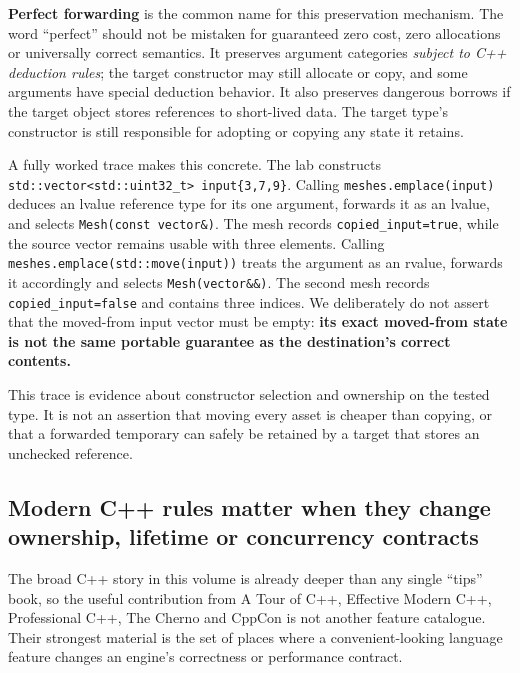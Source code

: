 \textbf{Perfect forwarding} is the common name for this preservation mechanism. The word ``perfect'' should not be mistaken for guaranteed zero cost, zero allocations or universally correct semantics. It preserves argument categories \emph{subject to C++ deduction rules}; the target constructor may still allocate or copy, and some arguments have special deduction behavior. It also preserves dangerous borrows if the target object stores references to short-lived data. The target type's constructor is still responsible for adopting or copying any state it retains.

A fully worked trace makes this concrete. The lab constructs \texttt{std::vector\textless{}std::uint32\_t\textgreater{}\ input\{3,7,9\}}. Calling \texttt{meshes.emplace(input)} deduces an lvalue reference type for its one argument, forwards it as an lvalue, and selects \texttt{Mesh(const\ vector\&)}. The mesh records \texttt{copied\_input=true}, while the source vector remains usable with three elements. Calling \texttt{meshes.emplace(std::move(input))} treats the argument as an rvalue, forwards it accordingly and selects \texttt{Mesh(vector\&\&)}. The second mesh records \texttt{copied\_input=false} and contains three indices. We deliberately do not assert that the moved-from input vector must be empty: \textbf{its exact moved-from state is not the same portable guarantee as the destination's correct contents.}

This trace is evidence about constructor selection and ownership on the tested type. It is not an assertion that moving every asset is cheaper than copying, or that a forwarded temporary can safely be retained by a target that stores an unchecked reference.

\subsection{Modern C++ rules matter when they change ownership, lifetime or concurrency contracts}\label{01-foundations-i-ch005-modern-c-rules-matter-when-they-change-ownership-lifetime-or-concurrency-contracts}

The broad C++ story in this volume is already deeper than any single ``tips'' book, so the useful contribution from A Tour of C++, Effective Modern C++, Professional C++, The Cherno and CppCon is not another feature catalogue. Their strongest material is the set of places where a convenient-looking language feature changes an engine's correctness or performance contract.

